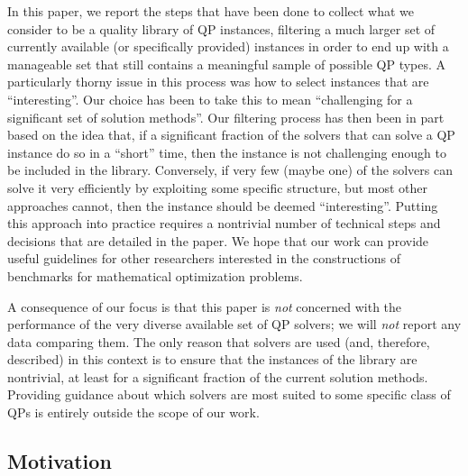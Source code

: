 In this paper, we report the steps that have been done to collect what we consider to be a quality library of QP instances, filtering a much larger set of currently available (or specifically provided) instances in order to end up with a manageable set that still contains a meaningful sample of possible QP types. A particularly thorny issue in this process was how to select instances that are ``interesting''. Our choice has been to take this to mean ``challenging for a significant set of solution methods''. Our filtering process has then been in part based on the idea that, if a significant fraction of the solvers that can solve a QP instance do so in a ``short'' time, then the instance is not challenging enough to be included in the library. Conversely, if very few (maybe one) of the solvers can solve it very efficiently by exploiting some specific structure, but most other approaches cannot, then the instance should be deemed ``interesting''. Putting this approach into practice requires a nontrivial number of technical steps and decisions that are detailed in the paper. We hope that our work can provide useful guidelines for other researchers interested in the constructions of benchmarks for mathematical optimization problems.

A consequence of our focus is that this paper is \emph{not} concerned with the performance of the very diverse available set of QP solvers; we will \emph{not} report any data comparing them. The only reason that solvers are used (and, therefore, described) in this context is to ensure that the instances of the library are nontrivial, at least for a significant fraction of the current solution methods. Providing guidance about which solvers are most suited to some specific class of QPs is entirely outside the scope of our work.

\subsection{Motivation}\label{subsec:motiv}


